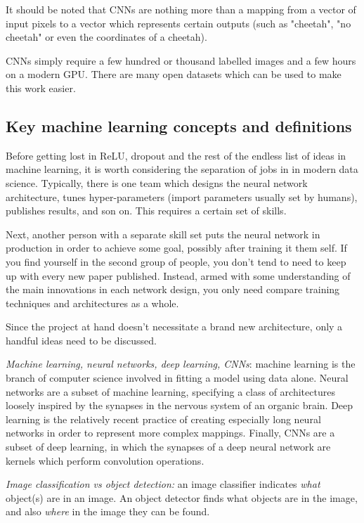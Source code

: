 It should be noted that CNNs are nothing more than a mapping from a vector of input pixels to a vector which represents certain outputs (such as "cheetah", "no cheetah" or even the coordinates of a cheetah).

CNNs simply require a few hundred or thousand labelled images and a few hours on a modern GPU. There are many open datasets which can be used to make this work easier.

\subsection{Key machine learning concepts and definitions}
Before getting lost in ReLU, dropout and the rest of the endless list of ideas in machine learning, it is worth considering the separation of jobs in in modern data science. Typically, there is one team which designs the neural network architecture, tunes hyper-parameters (import parameters usually set by humans), publishes results, and son on. This requires a certain set of skills.

Next, another person with a separate skill set puts the neural network in production in order to achieve some goal, possibly after training it them self. If you find yourself in the second group of people, you don't tend to need to keep up with every new paper published. Instead, armed with some understanding of the main innovations in each network design, you only need compare training techniques and architectures as a whole.

Since the project at hand doesn't necessitate a brand new architecture, only a handful ideas need to be discussed.

\textit{Machine learning, neural networks, deep learning, CNNs}: machine learning is the branch of computer science involved in fitting a model using data alone. Neural networks are a subset of machine learning, specifying a class of architectures loosely inspired by the synapses in the nervous system of an organic brain. Deep learning is the relatively recent practice of creating especially long neural networks in order to represent more complex mappings. Finally, CNNs are a subset of deep learning, in which the synapses of a deep neural network are kernels which perform convolution operations.

\textit{Image classification vs object detection:} an image classifier indicates \emph{what} object(s) are in an image. An object detector finds what objects are in the image, and also \emph{where} in the image they can be found.

